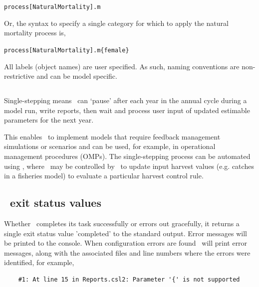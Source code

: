 \texttt{process[NaturalMortality].m}

Or, the syntax to specify a single category for which to apply the natural mortality process is,

\texttt{process[NaturalMortality].m\{female\}}

All labels (object names) are user specified. As such, naming conventions are non-restrictive and can be model specific.


\subsection{\label{sec:singlestepping}}

Single-stepping means \CNAME\ can `pause' after each year in the annual cycle during a model run, write reports, then wait and process user input of updated estimable parameters for the next year. 

This enables \CNAME\ to implement models that require feedback management simulations or scenarios and can be used, for example, in operational management procedures (OMPs). The single-stepping process can be automated using \R, where \CNAME\ may be controlled by \R\ to update input harvest values (e.g. catches in a fisheries model) to evaluate a particular harvest control rule. 

\subsection{\CNAME\ exit status values}
Whether \CNAME\ completes its task successfully or errors out gracefully, it returns a single exit status value 'completed' to the standard output. Error messages will be printed to the console. When configuration errors are found \CNAME\ will print error messages, along with the associated files and line numbers where the errors were identified, for example,

{\small{\begin{verbatim}
	#1: At line 15 in Reports.csl2: Parameter '{' is not supported
\end{verbatim}}}	